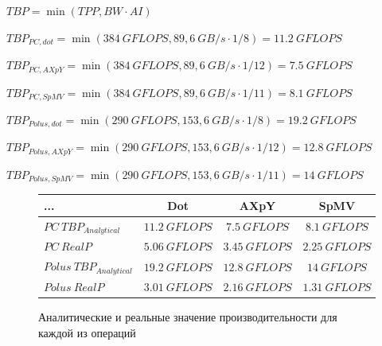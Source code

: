 \documentclass[12pt, a4paper]{article}
\begin{document}
$ TBP = \min(TPP, BW \cdot AI)  $

$ TBP_{PC, dot} = \min(384\ GFLOPS, 89,6\ GB/s \cdot 1/8) = 11.2\ GFLOPS $

$ TBP_{PC, AXpY} = \min(384\ GFLOPS, 89,6\ GB/s \cdot 1/12) = 7.5\ GFLOPS $

$ TBP_{PC, SpMV} = \min(384\ GFLOPS, 89,6\ GB/s \cdot 1/11) = 8.1\ GFLOPS $

$ TBP_{Polus, dot} = \min(290\ GFLOPS, 153,6\ GB/s \cdot 1/8) = 19.2\ GFLOPS $

$ TBP_{Polus, AXpY} = \min(290\ GFLOPS, 153,6\ GB/s \cdot 1/12) = 12.8\ GFLOPS $

$ TBP_{Polus, SpMV} = \min(290\ GFLOPS, 153,6\ GB/s \cdot 1/11) = 14\ GFLOPS $

\begin{figure}[h!]
	\center
	\setlength{\tabcolsep}{10pt}
	\renewcommand{\arraystretch}{1.5}
	\begin{tabular}{|l|c|c|c|}
		\hline
		... & Dot & AXpY & SpMV \\
		\hline
		$PC\ TBP_{Analytical} $ & $ 11.2\ GFLOPS $ & $ 7.5\ GFLOPS $ & $ 8.1\ GFLOPS $ \\
		\hline
		$PC\ RealP $ & $ 5.06\ GFLOPS $ & $ 3.45\ GFLOPS $ & $ 2.25\ GFLOPS $ \\
		\hline
		$ Polus\ TBP_{Analytical} $& $ 19.2\ GFLOPS $ & $ 12.8\ GFLOPS $ & $ 14\ GFLOPS $ \\
		\hline
		$ Polus\ RealP $ & $ 3.01\ GFLOPS $ & $ 2.16\ GFLOPS $ & $ 1.31\ GFLOPS $ \\
		\hline
	\end{tabular}
	\caption{Аналитические и реальные значение производительности для каждой из операций}
	\label{fig:tbps}
\end{figure}
\end{document}
